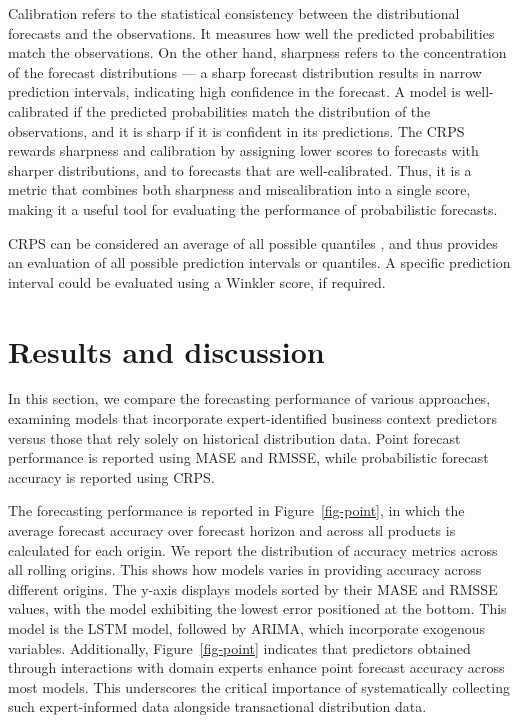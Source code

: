 \documentclass[
  authoryear,
  preprint,
  3p]{elsarticle}
\begin{document}
Calibration refers to the statistical consistency between the
distributional forecasts and the observations. It measures how well the
predicted probabilities match the observations. On the other hand,
sharpness refers to the concentration of the forecast distributions ---
a sharp forecast distribution results in narrow prediction intervals,
indicating high confidence in the forecast. A model is well-calibrated
if the predicted probabilities match the distribution of the
observations, and it is sharp if it is confident in its predictions. The
CRPS rewards sharpness and calibration by assigning lower scores to
forecasts with sharper distributions, and to forecasts that are
well-calibrated. Thus, it is a metric that combines both sharpness and
miscalibration into a single score, making it a useful tool for
evaluating the performance of probabilistic forecasts.

CRPS can be considered an average of all possible quantiles
\citep[Section 5.9]{hyndman2021forecasting}, and thus provides an
evaluation of all possible prediction intervals or quantiles. A specific
prediction interval could be evaluated using a Winkler score, if
required.

\section{Results and discussion}\label{sec-results}

In this section, we compare the forecasting performance of various
approaches, examining models that incorporate expert-identified business
context predictors versus those that rely solely on historical
distribution data. Point forecast performance is reported using MASE and
RMSSE, while probabilistic forecast accuracy is reported using CRPS.

The forecasting performance is reported in Figure~\ref{fig-point}, in
which the average forecast accuracy over forecast horizon and across all
products is calculated for each origin. We report the distribution of
accuracy metrics across all rolling origins. This shows how models
varies in providing accuracy across different origins. The y-axis
displays models sorted by their MASE and RMSSE values, with the model
exhibiting the lowest error positioned at the bottom. This model is the
LSTM model, followed by ARIMA, which incorporate exogenous variables.
Additionally, Figure~\ref{fig-point} indicates that predictors obtained
through interactions with domain experts enhance point forecast accuracy
across most models. This underscores the critical importance of
systematically collecting such expert-informed data alongside
transactional distribution data.
\end{document}
